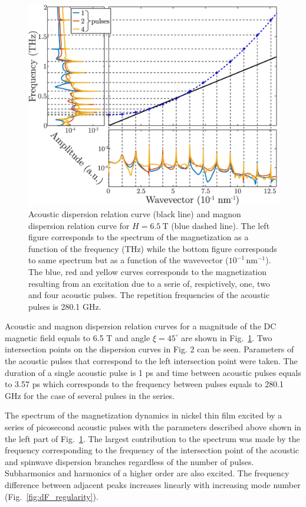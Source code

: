 \documentclass[%
superscriptaddress,
preprint,
showpacs,
amsmath,
amssymb,
aps,
prl,
]{revtex4-1}
\begin{document}
\begin{figure}[ht]
	\centering
	\includegraphics[width=0.95\columnwidth]{Figures/dispersionRelation-H6.5T-Ni30nm-3.57_2ps.eps}
	\caption{Acoustic dispersion relation curve (black line) and magnon dispersion relation curve for $H = 6.5\ \mathrm{T}$ (blue dashed line). The left figure corresponds to the spectrum of the magnetization as a function of the frequency (THz) while the bottom figure corresponds to same spectrum but as a function of the wavevector ($10^{-1}\, \mathrm{nm}^{-1}$). The blue, red and yellow curves corresponds to the magnetization resulting from an excitation due to a serie of, respictively, one, two and four acoustic pulses. The repetition frequencies of the acoustic pulses is 280.1 GHz.}
	\label{fig:dispersionRelationHNi}
\end{figure}
	
Acoustic and magnon dispersion relation curves for a magnitude of the DC magnetic field equals to 6.5 T and angle $\xi = 45^{\circ}$  are shown in Fig.~\ref{fig:dispersionRelationHNi}. Two intersection points on the dispersion curves in Fig. 2 can be seen. Parameters of the acoustic pulses that correspond to the left intersection point were taken. The duration of a single acoustic pulse is 1 ps and time between acoustic pulses equals to 3.57 ps which corresponds to the frequency between pulses equals to 280.1 GHz for the case of several pulses in the series.
	
The spectrum of the magnetization dynamics in nickel thin film excited by a series of picosecond acoustic pulses with the parameters described above shown in the left part of Fig.~\ref{fig:dispersionRelationHNi}. The largest contribution to the spectrum was made by the frequency corresponding to the frequency of the intersection point of the acoustic and spinwave dispersion branches regardless of the number of pulses. Subharmonics and harmonics of a higher order are also excited. The frequency difference between adjacent peaks increases linearly with increasing mode number (Fig.~\ref{fig:dF_regularity}).
	
\end{document}
